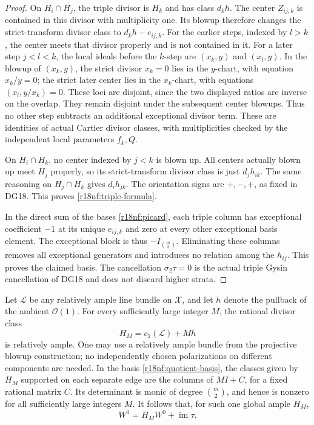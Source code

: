 \begin{proof}
On $H_i\cap H_j$, the triple divisor is $H_k$ and has
class $d_kh$.  The center $Z_{ij,k}$ is contained in this
divisor with multiplicity one.  Its blowup therefore changes
the strict-transform divisor class to $d_kh-e_{ij,k}$.
For the earlier steps, indexed by $l>k$, the center meets
that divisor properly and is not contained in it.  For a later
step $j<l<k$, the local ideals before the $k$-step are
$(x_k,y)$ and $(x_l,y)$.  In the blowup of $(x_k,y)$, the
strict divisor $x_k=0$ lies in the $y$-chart, with equation
$x_k/y=0$; the strict later center lies in the $x_k$-chart,
with equations $(x_l,y/x_k)=0$.  These loci are disjoint,
since the two displayed ratios are inverse on the overlap.
They remain disjoint under the subsequent center blowups.
Thus no other step subtracts an additional exceptional
divisor term.  These are identities of actual Cartier divisor
classes, with multiplicities checked by the independent
local parameters $f_k,Q$.

On $H_i\cap H_k$, no center indexed by $j<k$ is blown up.
All centers actually blown up meet $H_j$ properly, so its
strict-transform divisor class is just $d_jh_{ik}$.
The same reasoning on $H_j\cap H_k$ gives $d_ih_{jk}$.
The orientation signs are $+,-,+$, as fixed in DG18.
This proves \eqref{r18nf:triple-formula}.

In the direct sum of the bases
\eqref{r18nf:picard}, each triple column has exceptional
coefficient $-1$ at its unique $e_{ij,k}$ and zero at
every other exceptional basis element.  The exceptional
block is thus $-I_{\binom m3}$.  Eliminating these columns
removes all exceptional generators and introduces no
relation among the $h_{ij}$.  This proves the claimed basis.
The cancellation $\sigma_2\tau=0$ is the actual triple
Gysin cancellation of DG18 and does not discard higher strata.
\end{proof}

Let $\mathcal L$ be any relatively ample line bundle on
$\mathcal X$, and let $h$ denote the pullback of the ambient
$\mathcal O(1)$.  For every sufficiently large integer $M$,
the rational divisor class
\[
                         H_M=c_1(\mathcal L)+Mh
 \tag{NF18.7}\label{r18nf:ample}
\]
is relatively ample.  One may use a relatively ample bundle
from the projective blowup construction; no independently
chosen polarizations on different components are needed.
In the basis \eqref{r18nf:quotient-basis}, the classes given
by $H_M$ supported on each separate edge are the columns
of $M I+C$, for a fixed rational matrix $C$.
Its determinant is monic of degree $\binom m2$, and hence
is nonzero for all sufficiently large integers $M$.
It follows that, for such one global ample $H_M$,
\[
                       W^1=H_M W^0+\operatorname{im}\tau.
 \tag{NF18.8}\label{r18nf:generation}
\]

